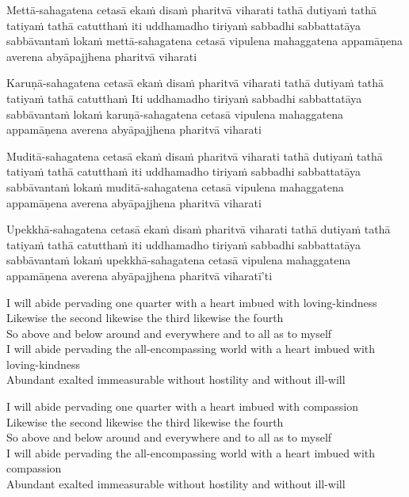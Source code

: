\begin{leader}
\end{leader}

Mettā-sahagatena cetasā ekaṁ disaṁ pharitvā viharati tathā dutiyaṁ tathā tatiyaṁ tathā catutthaṁ iti uddhamadho tiriyaṁ sabbadhi sabbattatāya sabbāvantaṁ lokaṁ mettā-sahagatena cetasā vipulena mahaggatena appamāṇena averena abyāpajjhena pharitvā viharati

Karuṇā-sahagatena cetasā ekaṁ disaṁ pharitvā viharati tathā dutiyaṁ tathā tatiyaṁ tathā catutthaṁ
Iti uddhamadho tiriyaṁ sabbadhi sabbattatāya sabbāvantaṁ lokaṁ karuṇā-sahagatena cetasā vipulena mahaggatena appamāṇena averena abyāpajjhena pharitvā viharati

Muditā-sahagatena cetasā ekaṁ disaṁ pharitvā viharati tathā dutiyaṁ tathā tatiyaṁ tathā catutthaṁ iti uddhamadho tiriyaṁ sabbadhi sabbattatāya sabbāvantaṁ lokaṁ muditā-sahagatena cetasā vipulena mahaggatena appamāṇena averena abyāpajjhena pharitvā viharati

Upekkhā-sahagatena cetasā ekaṁ disaṁ pharitvā viharati tathā dutiyaṁ tathā tatiyaṁ tathā catutthaṁ iti uddhamadho tiriyaṁ sabbadhi sabbattatāya sabbāvantaṁ lokaṁ upekkhā-sahagatena cetasā vipulena mahaggatena appamāṇena averena abyāpajjhena pharitvā viharatī'ti

\begin{leader}
\end{leader}

I will abide pervading one quarter with a heart imbued with loving-kindness\\
Likewise the second likewise the third likewise the fourth\\
So above and below around and everywhere and to all as to myself\\
I will abide pervading the all-encompassing world with a heart imbued with loving-kindness\\
Abundant exalted immeasurable without hostility and without ill-will

I will abide pervading one quarter with a heart imbued with compassion\\
Likewise the second likewise the third likewise the fourth\\
So above and below around and everywhere and to all as to myself\\
I will abide pervading the all-encompassing world with a heart imbued with compassion\\
Abundant exalted immeasurable without hostility and without ill-will


